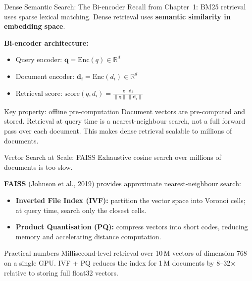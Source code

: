 \documentclass[11pt,aspectratio=169,professionalfonts]{beamer}
\begin{document}
\begin{frame}{Dense Semantic Search: The Bi-encoder}
  Recall from Chapter~1: BM25 retrieval uses sparse lexical matching.
  Dense retrieval uses \textbf{semantic similarity in embedding space}.

  \medskip
  \textbf{Bi-encoder architecture:}
  \begin{itemize}
    \item Query encoder: $\mathbf{q}=\mathrm{Enc}(q)\in\mathbb{R}^d$
    \item Document encoder: $\mathbf{d}_i=\mathrm{Enc}(d_i)\in\mathbb{R}^d$
    \item Retrieval score:
          $\displaystyle\mathrm{score}(q,d_i)
          =\frac{\mathbf{q}\cdot\mathbf{d}_i}{\|\mathbf{q}\|\,\|\mathbf{d}_i\|}$
  \end{itemize}

  \begin{block}{Key property: offline pre-computation}
    Document vectors are pre-computed and stored.
    Retrieval at query time is a nearest-neighbour search,
    not a full forward pass over each document.
    This makes dense retrieval scalable to millions of documents.
  \end{block}

\end{frame}
%
%
\begin{frame}{Vector Search at Scale: FAISS}
  Exhaustive cosine search over millions of documents is too slow.

  \textbf{FAISS} (Johnson et al., 2019) provides approximate
  nearest-neighbour search:
  \begin{itemize}
    \item \textbf{Inverted File Index (IVF):} partition the vector space
          into Voronoi cells; at query time, search only the closest cells.
    \item \textbf{Product Quantisation (PQ):} compress vectors into
          short codes, reducing memory and accelerating distance computation.
  \end{itemize}

  \begin{exampleblock}{Practical numbers}
    Millisecond-level retrieval over 10\,M vectors of dimension 768
    on a single GPU.
    IVF + PQ reduces the index for 1\,M documents by 8--32$\times$
    relative to storing full float32 vectors.
  \end{exampleblock}
\end{frame}
\end{document}
